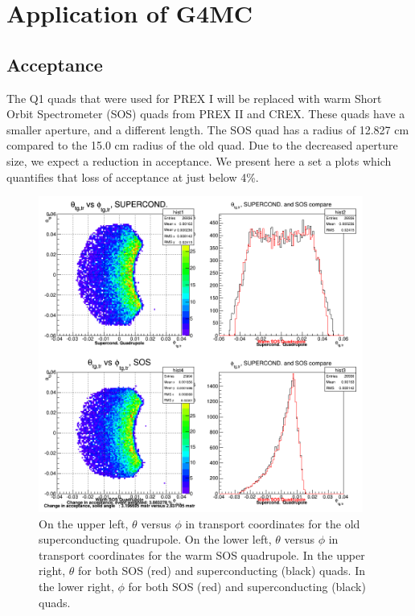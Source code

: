\documentclass[11pt]{amsart}
\begin{document}
\section{Application of G4MC}

\subsection{ Acceptance }

The Q1 quads that were used for PREX I will be replaced with warm Short Orbit Spectrometer (SOS) quads from PREX II and CREX. These quads have a smaller aperture, and a different length. The SOS quad has a radius of 12.827 cm compared to the 15.0 cm radius of the old quad. Due to the decreased aperture size, we expect a reduction in acceptance. We present here a set a plots which quantifies that loss of acceptance at just below 4\%.

\FloatBarrier
\begin{figure}
  \includegraphics[width=0.95\textwidth]{plots/acc.png}
  \caption{On the upper left, $\theta$ versus $\phi$ in transport coordinates for the old superconducting quadrupole. On the lower left, $\theta$ versus $\phi$ in transport coordinates for the warm SOS quadrupole. In the upper right, $\theta$ for both SOS (red) and superconducting (black) quads. In the lower right, $\phi$ for both SOS (red) and superconducting (black) quads.}
\end{figure}
\FloatBarrier
\end{document}
